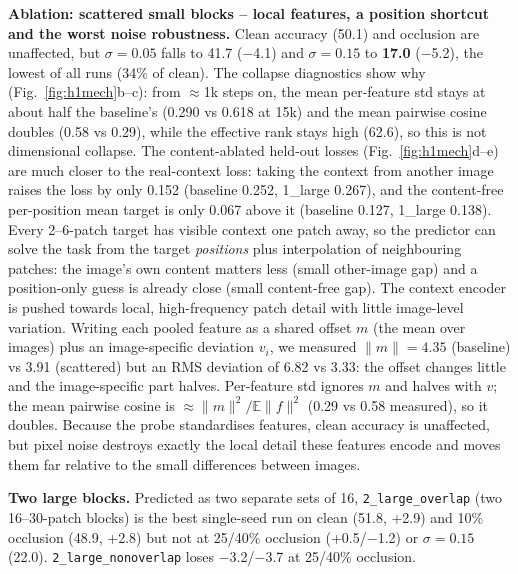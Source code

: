 \textbf{Ablation: scattered small blocks -- local features, a position shortcut and the worst noise robustness.}
\obs Clean accuracy (50.1) and occlusion are unaffected, but $\sigma{=}0.05$ falls to 41.7 ($-$4.1) and $\sigma{=}0.15$ to
\textbf{17.0} ($-$5.2), the lowest of all runs (34\% of clean). The collapse diagnostics show why
(Fig.~\ref{fig:h1mech}b--c): from $\approx$1k steps on, the mean per-feature std stays at about half the baseline's
(0.290 vs 0.618 at 15k) and the mean pairwise cosine doubles (0.58 vs 0.29), while the effective rank stays high (62.6),
so this is not dimensional collapse. The content-ablated held-out losses (Fig.~\ref{fig:h1mech}d--e) are much closer to
the real-context loss: taking the context from another image raises the loss by only 0.152 (baseline 0.252, 1\_large 0.267),
and the content-free per-position mean target is only 0.067 above it (baseline 0.127, 1\_large 0.138).
\interp Every 2--6-patch target has visible context one patch away, so the predictor can solve the task from the target
\emph{positions} plus interpolation of neighbouring patches: the image's own content matters less (small other-image gap)
and a position-only guess is already close (small content-free gap). The context encoder is pushed towards local,
high-frequency patch detail with little image-level variation. Writing each pooled feature as a shared offset $m$ (the
mean over images) plus an image-specific deviation $v_i$, we measured $\lVert m\rVert{=}4.35$ (baseline) vs 3.91
(scattered) but an RMS deviation of 6.82 vs 3.33: the offset changes little and the image-specific part halves.
Per-feature std ignores $m$ and halves with $v$; the mean pairwise cosine is $\approx\lVert m\rVert^2/\mathbb E\lVert f\rVert^2$
(0.29 vs 0.58 measured), so it doubles. Because the probe standardises features, clean accuracy is unaffected, but pixel noise
destroys exactly the local detail these features encode and moves them far relative to the small differences between
images. 

\textbf{Two large blocks.} Predicted as two separate sets of 16, \texttt{2\_large\_overlap} (two 16--30-patch blocks) is the
best single-seed run on clean (51.8, +2.9) and 10\% occlusion (48.9, +2.8) but not at 25/40\% occlusion (+0.5/$-$1.2) or
$\sigma{=}0.15$ (22.0). 
\texttt{2\_large\_nonoverlap} loses $-$3.2/$-$3.7 at 25/40\%
occlusion. 

